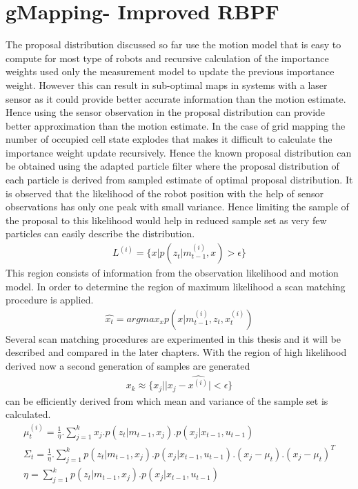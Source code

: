 \section{gMapping- Improved RBPF}
The proposal distribution discussed so far use the motion model that is easy to compute for most type of robots and recursive calculation of the importance weights used only the measurement model to update the previous importance weight. However this can result in sub-optimal maps in systems with a laser sensor as it could provide better accurate information than the motion estimate\cite{GMap_algo}. Hence using the sensor observation in the proposal distribution can provide better approximation than the motion estimate. In the case of grid mapping the number of occupied cell state explodes that makes it difficult to calculate the importance weight update recursively. Hence the known proposal distribution can be obtained using the adapted particle filter where the proposal distribution of each particle is derived from sampled estimate of optimal proposal distribution. It is observed that the likelihood of the robot position with the help of sensor observations has only one peak with small variance. Hence limiting the sample of the proposal to this likelihood would help in reduced sample set as very few particles can easily describe the distribution. 
\begin{gather} \label{gMap-L}
    L^{(i)} = \{ x | p(z_t| m_{t-1}^{(i)},x)>\epsilon\} 
\end{gather}
This region consists of information from the observation likelihood and motion model. In order to determine the region of maximum likelihood a scan matching procedure is applied. 
\begin{gather} \label{gMap-SM}
    \hat{x_t} = argmax_x p(x|m_{t-1}^{(i)}, z_t, x_t^{(i)})
\end{gather}
Several scan matching procedures are experimented in this thesis and it will be described and compared in the later chapters. With the region of high likelihood derived now a second generation of samples are generated 
\begin{gather} \label{gMap-2samp}
    x_k \approx \{x_j | |x_j - \hat{x^{(i)}}|<\epsilon \}
\end{gather}
can be efficiently derived from which mean and variance of the sample set is calculated. 
\begin{gather} \label{gMap-mu}
    \mu_t^{(i)} = \frac{1}{\eta}. \sum_{j = 1}^{k}  x_j.p(z_t | m_{t-1}, x_j). p(x_j | x_{t-1}, u_{t-1}) \\
    \varSigma_t = \frac{1}{\eta}. \sum_{j = 1}^{k}  p(z_t | m_{t-1}, x_j). p(x_j | x_{t-1}, u_{t-1}).(x_j - \mu_t).(x_j - \mu_t)^T \\
    \eta = \sum_{j = 1}^{k}  p(z_t | m_{t-1}, x_j). p(x_j | x_{t-1}, u_{t-1})
\end{gather}
